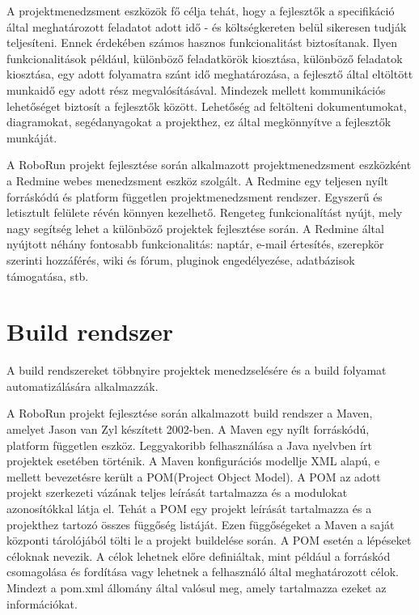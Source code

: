 	A projektmenedzsment eszközök fő célja tehát, hogy a fejlesztők a specifikáció által meghatározott feladatot adott idő - és költségkereten belül sikeresen tudják teljesíteni. Ennek érdekében számos hasznos funkcionalitást biztosítanak. Ilyen funkcionalitások például, különböző feladatkörök kiosztása, különböző feladatok kiosztása, egy adott folyamatra szánt idő meghatározása, a fejlesztő által eltöltött munkaidő egy adott rész megvalósításával. Mindezek mellett kommunikációs lehetőséget biztosít a fejlesztők között. Lehetőség ad feltölteni dokumentumokat, diagramokat, segédanyagokat a projekthez, ez által megkönnyítve a fejlesztők munkáját. 
	
	A RoboRun projekt fejlesztése során alkalmazott projektmenedzsment eszközként a Redmine\citep{redmine} webes menedzsment eszköz szolgált. A Redmine egy teljesen  nyílt forráskódú és platform független projektmenedzsment rendszer. Egyszerű és letisztult felülete révén könnyen kezelhető. Rengeteg funkcionalítást nyújt, mely nagy segítség lehet a különböző projektek fejlesztése során. A  Redmine által nyújtott néhány fontosabb funkcionalitás: naptár, e-mail értesítés, szerepkör szerinti hozzáférés, wiki és fórum, pluginok engedélyezése, adatbázisok támogatása, stb.



\section{Build rendszer}

A build rendszereket többnyire projektek menedzselésére és a build folyamat automatizálására alkalmazzák. 

	A RoboRun projekt fejlesztése során alkalmazott build rendszer a Maven\cite{maven}, amelyet Jason van Zyl készített 2002-ben. A Maven egy nyílt forráskódú, platform független eszköz. Leggyakoribb felhasználása a Java nyelvben írt projektek esetében történik. A Maven konfigurációs modellje XML alapú, e mellett bevezetésre került a POM(Project Object Model). A POM az adott projekt szerkezeti vázának teljes leírását tartalmazza és a modulokat azonosítókkal látja el. Tehát a POM egy projekt leírását tartalmazza és a projekthez tartozó összes függőség listáját. Ezen függőségeket a Maven a saját központi tárolójából tölti le a projekt buildelése során. A POM esetén a lépéseket céloknak nevezik. A célok lehetnek előre definiáltak, mint például a forráskód csomagolása és fordítása vagy lehetnek a felhasználó által meghatározott célok.  Mindezt a pom.xml állomány által valósul meg, amely tartalmazza ezeket az információkat. 
	
